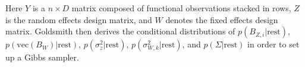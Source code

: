 Here \(Y\) is a \(n\times D\) matrix composed of functional observations stacked in rows, \(Z\) is the random effects design matrix, 
and \(W\) denotes the fixed effects design matrix.  Goldsmith then derives the conditional distributions of 
\(p\left(B_{Z,i}|\text{rest}\right)\), \(p\left(\text{vec}(B_W)|\text{rest}\right)\), \(p\left(\sigma_z^2|\text{rest}\right)\), 
\(p\left(\sigma_{W,k}^2|\text{rest}\right)\), and \(p\left(\Sigma|\text{rest}\right)\) in order to set up a Gibbs sampler. 
